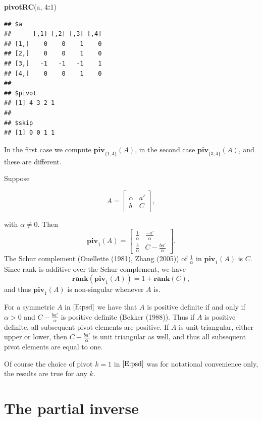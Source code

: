 \documentclass[12pt,]{article}
\newenvironment{Shaded}{\begin{snugshade}}{\end{snugshade}}
\newcommand{\KeywordTok}[1]{\textcolor[rgb]{0.13,0.29,0.53}{\textbf{#1}}}
\newcommand{\DecValTok}[1]{\textcolor[rgb]{0.00,0.00,0.81}{#1}}
\newcommand{\OperatorTok}[1]{\textcolor[rgb]{0.81,0.36,0.00}{\textbf{#1}}}
\newcommand{\NormalTok}[1]{#1}
\begin{document}
\begin{Shaded}
\begin{Highlighting}[]
\KeywordTok{pivotRC}\NormalTok{(a, }\DecValTok{4}\OperatorTok{:}\DecValTok{1}\NormalTok{)}
\end{Highlighting}
\end{Shaded}

\begin{verbatim}
## $a
##      [,1] [,2] [,3] [,4]
## [1,]    0    0    1    0
## [2,]    0    0    1    0
## [3,]   -1   -1   -1    1
## [4,]    0    0    1    0
## 
## $pivot
## [1] 4 3 2 1
## 
## $skip
## [1] 0 0 1 1
\end{verbatim}

In the first case we compute \(\mathbf{piv}_{\{1,4\}}(A)\), in the
second case \(\mathbf{piv}_{\{3,4\}}(A)\), and these are different.

Suppose

\begin{equation}
A=\begin{bmatrix}\alpha&a'\\b&C\end{bmatrix},\label{E:psd}
\end{equation}

with \(\alpha\not= 0\). Then \[
\mathbf{piv}_1(A)=\begin{bmatrix}\frac{1}{\alpha}&\frac{-a'}{\alpha}\\\frac{b}{\alpha}&C-\frac{ba'}{\alpha}\end{bmatrix}.
\] The Schur complement (Ouellette (1981), Zhang (2005)) of
\(\frac{1}{\alpha}\) in \(\mathbf{piv}_1(A)\) is \(C\). Since rank is
additive over the Schur complement, we have \[
\mathbf{rank}(\mathbf{piv}_1(A))=1+\mathbf{rank}(C),
\] and thus \(\mathbf{piv}_1(A)\) is non-singular whenever \(A\) is.

For a symmetric \(A\) in \(\eqref{E:psd}\) we have that \(A\) is
positive definite if and only if \(\alpha>0\) and
\(C-\frac{ba'}{\alpha}\) is positive definite (Bekker (1988)). Thus if
\(A\) is positive definite, all subsequent pivot elements are positive.
If \(A\) is unit triangular, either upper or lower, then
\(C-\frac{ba'}{\alpha}\) is unit triangular as well, and thus all
subsequent pivot elements are equal to one.

Of course the choice of pivot \(k=1\) in \(\eqref{E:psd}\) was for
notational convenience only, the results are true for any \(k\).

\section{The partial inverse}\label{the-partial-inverse}
\end{document}
